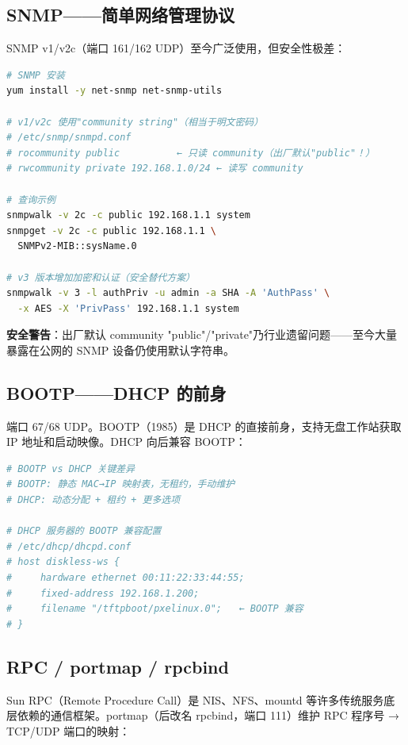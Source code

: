 \documentclass[12pt,UTF8]{ctexbook}
\begin{document}
\subsection{SNMP——简单网络管理协议}

SNMP v1/v2c（端口 161/162 UDP）至今广泛使用，但安全性极差：

\begin{lstlisting}[language=bash]
# SNMP 安装
yum install -y net-snmp net-snmp-utils

# v1/v2c 使用"community string"（相当于明文密码）
# /etc/snmp/snmpd.conf
# rocommunity public          ← 只读 community（出厂默认"public"！）
# rwcommunity private 192.168.1.0/24 ← 读写 community

# 查询示例
snmpwalk -v 2c -c public 192.168.1.1 system
snmpget -v 2c -c public 192.168.1.1 \
  SNMPv2-MIB::sysName.0

# v3 版本增加加密和认证（安全替代方案）
snmpwalk -v 3 -l authPriv -u admin -a SHA -A 'AuthPass' \
  -x AES -X 'PrivPass' 192.168.1.1 system
\end{lstlisting}

\textbf{安全警告}：出厂默认 community "public"/"private"乃行业遗留问题——至今大量暴露在公网的 SNMP 设备仍使用默认字符串。

\subsection{BOOTP——DHCP 的前身}

端口 67/68 UDP。BOOTP（1985）是 DHCP 的直接前身，支持无盘工作站获取 IP 地址和启动映像。DHCP 向后兼容 BOOTP：

\begin{lstlisting}[language=bash]
# BOOTP vs DHCP 关键差异
# BOOTP: 静态 MAC→IP 映射表，无租约，手动维护
# DHCP: 动态分配 + 租约 + 更多选项

# DHCP 服务器的 BOOTP 兼容配置
# /etc/dhcp/dhcpd.conf
# host diskless-ws {
#     hardware ethernet 00:11:22:33:44:55;
#     fixed-address 192.168.1.200;
#     filename "/tftpboot/pxelinux.0";   ← BOOTP 兼容
# }
\end{lstlisting}

\subsection{RPC / portmap / rpcbind}

Sun RPC（Remote Procedure Call）是 NIS、NFS、mountd 等许多传统服务底层依赖的通信框架。portmap（后改名 rpcbind，端口 111）维护 RPC 程序号 → TCP/UDP 端口的映射：
\end{document}
